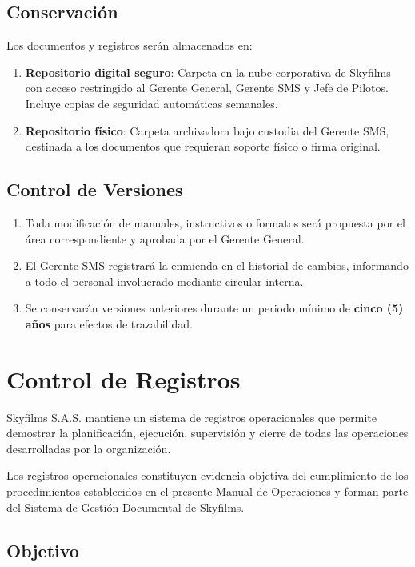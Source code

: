 \subsection{Conservación}
Los documentos y registros serán almacenados en:
\begin{enumerate}
    \item \textbf{Repositorio digital seguro}: Carpeta en la nube corporativa de Skyfilms con acceso restringido al Gerente General, Gerente SMS y Jefe de Pilotos. Incluye copias de seguridad automáticas semanales.
    \item \textbf{Repositorio físico}: Carpeta archivadora bajo custodia del Gerente SMS, destinada a los documentos que requieran soporte físico o firma original.
\end{enumerate}



\subsection{Control de Versiones}
\begin{enumerate}
    \item Toda modificación de manuales, instructivos o formatos será propuesta por el área correspondiente y aprobada por el Gerente General.
    \item El Gerente SMS registrará la enmienda en el historial de cambios, informando a todo el personal involucrado mediante circular interna.
    \item Se conservarán versiones anteriores durante un periodo mínimo de \textbf{cinco (5) años} para efectos de trazabilidad.
\end{enumerate}





\section{Control de Registros}

Skyfilms S.A.S. mantiene un sistema de registros operacionales que permite demostrar la planificación, ejecución, supervisión y cierre de todas las operaciones desarrolladas por la organización.

Los registros operacionales constituyen evidencia objetiva del cumplimiento de los procedimientos establecidos en el presente Manual de Operaciones y forman parte del Sistema de Gestión Documental de Skyfilms.


\subsection{Objetivo}

